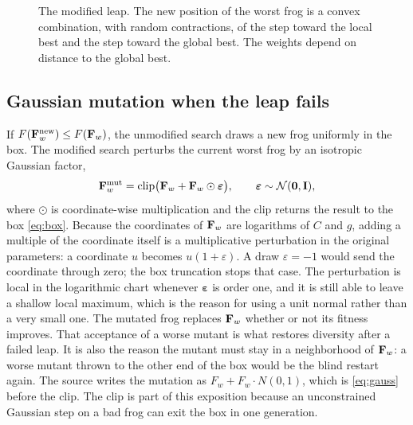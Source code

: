 \begin{figure}[H]
\centering
{}
\caption{The modified leap. The new position of the worst frog is a convex combination, with random contractions, of the step toward the local best and the step toward the global best. The weights depend on distance to the global best.}
\label{fig:leap}
\end{figure}

\subsection{Gaussian mutation when the leap fails}

If \(F(\mathbf{F}_{w}^{\mathrm{new}})\le F(\mathbf{F}_{w})\), the unmodified search draws a new frog uniformly in the box.
The modified search perturbs the current worst frog by an isotropic Gaussian factor,
\begin{equation}
\mathbf{F}_{w}^{\mathrm{mut}}
=\mathrm{clip}\bigl(\mathbf{F}_{w}+\mathbf{F}_{w}\odot\boldsymbol{\varepsilon}\bigr),
\qquad
\boldsymbol{\varepsilon}\sim\mathcal{N}(\mathbf{0}, \mathbf{I}),
\label{eq:gauss}
\end{equation}
where \(\odot\) is coordinate-wise multiplication and the clip returns the result to the box \eqref{eq:box}.
Because the coordinates of \(\mathbf{F}_{w}\) are logarithms of \(C\) and \(g\), adding a multiple of the coordinate itself is a multiplicative perturbation in the original parameters:
a coordinate \(u\) becomes \(u(1+\varepsilon)\).
A draw \(\varepsilon=-1\) would send the coordinate through zero; the box truncation stops that case.
The perturbation is local in the logarithmic chart whenever \(\boldsymbol{\varepsilon}\) is order one, and it is still able to leave a shallow local maximum, which is the reason for using a unit normal rather than a very small one.
The mutated frog replaces \(\mathbf{F}_{w}\) whether or not its fitness improves.
That acceptance of a worse mutant is what restores diversity after a failed leap.
It is also the reason the mutant must stay in a neighborhood of \(\mathbf{F}_{w}\): a worse mutant thrown to the other end of the box would be the blind restart again.
The source writes the mutation as \(F_{w}+F_{w}\cdot N(0,1)\), which is \eqref{eq:gauss} before the clip.
The clip is part of this exposition because an unconstrained Gaussian step on a bad frog can exit the box in one generation.

